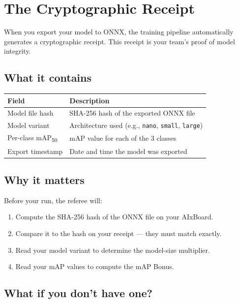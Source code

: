 \documentclass[a4]{article}
\begin{document}
\pagebreak
\section*{The Cryptographic Receipt}

When you export your model to ONNX, the training pipeline automatically generates a cryptographic receipt. This receipt is your team's proof of model integrity.

\subsection*{What it contains}

\begin{table}[H]
\centering
\begin{tabular}{ll}
\toprule
\textbf{Field} & \textbf{Description} \\
\midrule
Model file hash & SHA-256 hash of the exported ONNX file \\
Model variant & Architecture used (e.g., \texttt{nano}, \texttt{small}, \texttt{large}) \\
Per-class mAP\textsubscript{50} & mAP value for each of the 3 classes \\
Export timestamp & Date and time the model was exported \\
\bottomrule
\end{tabular}
\end{table}

\subsection*{Why it matters}

Before your run, the referee will:
\begin{enumerate}
    \item Compute the SHA-256 hash of the ONNX file on your AIxBoard.
    \item Compare it to the hash on your receipt --- they must match exactly.
    \item Read your model variant to determine the model-size multiplier.
    \item Read your mAP values to compute the mAP Bonus.
\end{enumerate}

\subsection*{What if you don't have one?}
\end{document}
